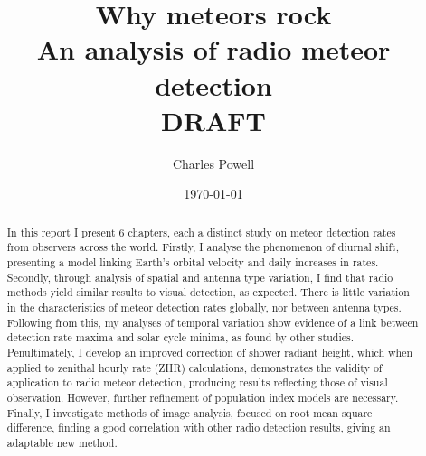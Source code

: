 \documentclass[a4paper,10pt,notitlepage, twocolumn]{report}
\title{\huge Why meteors rock \\ \large An analysis of radio meteor detection \\ \vspace{1em} \huge {\bf DRAFT}}
\author{Charles Powell}
\begin{document}
	

\begin{titlingpage}
\date{\today}
\maketitle

\vspace{10em}
\begin{abstract}
	In this report I present 6 chapters, each a distinct study on meteor detection rates from observers across the world. Firstly, I analyse the phenomenon of diurnal shift, presenting a model linking Earth's orbital velocity and daily increases in rates. Secondly, through analysis of spatial and antenna type variation, I find that radio methods yield similar results to visual detection, as expected. There is little variation in the characteristics of meteor detection rates globally, nor between antenna types. Following from this, my analyses of temporal variation show evidence of a link between detection rate maxima and solar cycle minima, as found by other studies. Penultimately, I develop an improved correction of shower radiant height, which when applied to zenithal hourly rate (ZHR) calculations, demonstrates the validity of application to radio meteor detection, producing results reflecting those of visual observation. However, further refinement of population index models are necessary. Finally, I investigate methods of image analysis, focused on root mean square difference, finding a good correlation with other radio detection results, giving an adaptable new method.
\end{abstract}
\end{titlingpage}

\tableofcontents









\onecolumn

\begin{appendices}

\end{appendices}
\printbibliography
\end{document}
